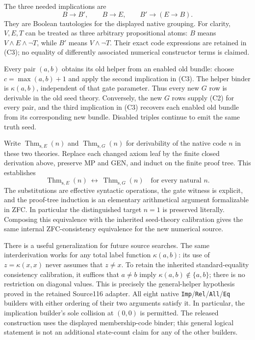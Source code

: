 The three needed implications are
\[
 B\to B',\qquad B\to E,\qquad B'\to(E\to B).           \tag{C3}
\]
They are Boolean tautologies for the displayed native grouping.
For clarity, $V,E,T$ can be treated as three arbitrary propositional
atoms: $B$ means $V\land E\land\neg T$, while $B'$ means
$V\land\neg T$.  Their exact code expressions are retained in (C3);
no equality of differently associated numerical constructor terms is
claimed.

Every pair $(a,b)$ obtains its old helper from an enabled old bundle:
choose $c=\max(a,b)+1$ and apply the second implication in (C3).
The helper binder is $\kappa(a,b)$, independent of that gate parameter.
Thus every new $G$ row is derivable in the old seed theory.  Conversely,
the new $G$ rows supply (C2) for every pair, and the third implication in
(C3) recovers each enabled old bundle from its corresponding new bundle.
Disabled triples continue to emit the same truth seed.

Write $\operatorname{Thm}_{\mathrm{s},E}(n)$ and
$\operatorname{Thm}_{\mathrm{s},G}(n)$ for derivability of the native
code $n$ in these two theories.  Replace each changed axiom leaf by the
finite closed derivation above, preserve MP and GEN, and induct on the
finite proof tree.  This establishes
\[
 \boxed{\quad
 \operatorname{Thm}_{\mathrm{s},E}(n)
 \ \longleftrightarrow\
 \operatorname{Thm}_{\mathrm{s},G}(n)
 \quad\text{for every natural }n.\quad}
\]
The substitutions are effective syntactic operations, the gate witness
is explicit, and the proof-tree induction is an elementary
arithmetical argument formalizable in ZFC.  In particular the
distinguished target $n=1$ is preserved literally.  Composing this
equivalence with the inherited seed-theory calibration gives the same
internal ZFC-consistency equivalence for the new numerical source.

There is a useful generalization for future source searches.  The same
interderivation works for any total label function $\kappa(a,b)$:
its use of $z=\kappa(x,x)$ never assumes that $z\ne x$.  To retain the
inherited standard-equality consistency calibration, it suffices that
$a\ne b$ imply $\kappa(a,b)\notin\{a,b\}$; there is no restriction
on diagonal values.  This is precisely the general-helper hypothesis
proved in the retained Source116 adapter.  All eight native
\texttt{Imp}/\texttt{Rel}/\texttt{All}/\texttt{Eq} builders with
either ordering of their two arguments satisfy it.  In particular,
the implication builder's sole collision at $(0,0)$ is permitted.
The released construction uses the displayed membership-code binder;
this general logical statement is not an additional state-count claim
for any of the other builders.

